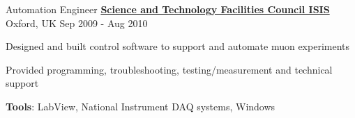 \begin{cventries}
{\begin{cvitems}
  		\end{cvitems}
  	}
  \cventry
  	{Automation Engineer}
  	{\href{http://www.isis.stfc.ac.uk/}{\textbf{Science and Technology Facilities Council ISIS}}}
  	{Oxford, UK}
  	{Sep 2009 - Aug 2010}
  	{
  		\begin{cvitems}
  			\item {Designed and built control software to support and automate muon experiments} 
  			\item {Provided programming, troubleshooting, testing/measurement and technical support} 
  			\item {\textbf{Tools}: LabView, National Instrument DAQ systems, Windows}
  		\end{cvitems}
  	}
\end{cventries}

